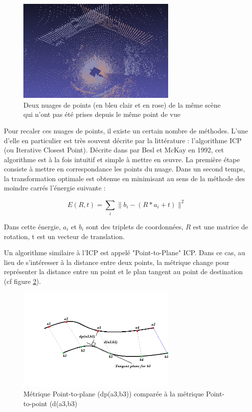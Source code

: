 \begin{figure}[H]
\centering
\includegraphics[width = 0.7\textwidth]{Images/Resume/nuage_recalage}
\caption{Deux nuages de points (en bleu clair et en rose) de la même scène qui n'ont pas été prises depuis le même point de vue}
\label{fig_nuage_recalage}
\end{figure}

Pour recaler ces nuages de points, il existe un certain nombre de méthodes. L'une d'elle en particulier est très souvent décrite par la littérature : l'algorithme ICP (ou Iterative Closest Point). Décrite dans \cite{bib_icp} par Besl et McKay en 1992, cet algorithme est à la fois intuitif et simple à mettre en œuvre. La première étape consiste à mettre en correspondance les points du nuage. Dans un second temps, la transformation optimale est obtenue en minimisant au sens de la méthode des moindre carrés l'énergie suivante :

\begin{equation}
E(R,t) = \sum_{i}\|b_{i}-(R*a_{i} + t)\|^{2}
\end{equation}

Dans cette énergie, $a_{i}$ et $b_{i}$ sont des triplets de coordonnées, $R$ est une matrice de rotation, t est un vecteur de translation.

Un algorithme similaire à l'ICP est appelé "Point-to-Plane" ICP. Dans ce cas, au lieu de s'intéresser à la distance entre deux points, la métrique change pour représenter la distance entre un point et le plan tangent au point de destination (cf figure \ref{fig_pointtoplane}).

\begin{figure}[H]
\centering
\includegraphics[width = 0.7\textwidth]{Images/Resume/icp_pointplan}
\caption{Métrique Point-to-plane (dp(a3,b3)) comparée à la métrique Point-to-point (d(a3,b3)}
\label{fig_pointtoplane}
\end{figure}

